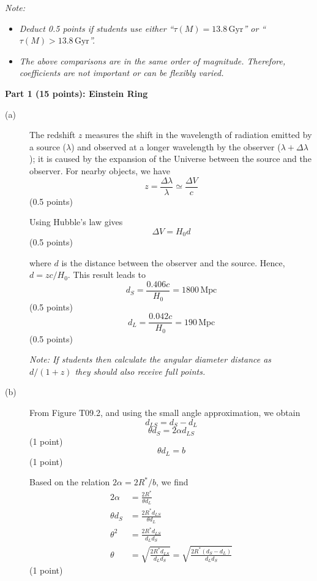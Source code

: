 \begin{description}
  \textit{Note:}
  \begin{itemize}
  \item \textit{Deduct 0.5 points if students use either
    ``$\tau(M) = 13.8\,\mathrm{Gyr}$'' or ``$\tau(M) > 13.8\,\mathrm{Gyr}$''.}
  \item \textit{The above comparisons are in the same order of magnitude.
    Therefore, coefficients are not important or can be flexibly varied.}
  \end{itemize}
\end{description}

\noindent\textbf{Part 1 (15 points): Einstein Ring}

\begin{description}
\item[(a)] The redshift $z$ measures the shift in the wavelength of radiation
  emitted by a source ($\lambda$) and observed at a longer wavelength by the
  observer ($\lambda + \Delta\lambda$); it is caused by the expansion of the
  Universe between the source and the observer. For nearby objects, we have
  \[ z = \frac{\Delta\lambda}{\lambda} \simeq \frac{\Delta V}{c} \]
  \hfill(0.5 points)

  Using Hubble's law gives
  \[ \Delta V = H_0 d \]
  \hfill(0.5 points)

  where $d$ is the distance between the observer and the source. Hence,
  $d = zc/H_0$. This result leads to
  \[ d_S = \frac{0.406c}{H_0} = 1800\,\mathrm{Mpc} \]
  \hfill(0.5 points)
  \[ d_L = \frac{0.042c}{H_0} = 190\,\mathrm{Mpc} \]
  \hfill(0.5 points)

  \textit{Note: If students then calculate the angular diameter distance as
  $d/(1+z)$ they should also receive full points.}

\item[(b)] From Figure T09.2, and using the small angle approximation, we
  obtain
  \[ d_{LS} = d_S - d_L \]
  \[ \theta d_S = 2\alpha d_{LS} \]
  \hfill(1 point)
  \[ \theta d_L = b \]
  \hfill(1 point)

  Based on the relation $2\alpha = 2R^*/b$, we find
  \begin{align*}
    2\alpha &= \frac{2R^*}{\theta d_L} \\
    \theta d_S &= \frac{2R^* d_{LS}}{\theta d_L} \\
    \theta^2 &= \frac{2R^* d_{LS}}{d_L d_S} \\
    \theta &= \sqrt{\frac{2R^* d_{LS}}{d_L d_S}}
            = \sqrt{\frac{2R^*(d_S - d_L)}{d_L d_S}}
  \end{align*}
  \hfill(1 point)


\end{description}
